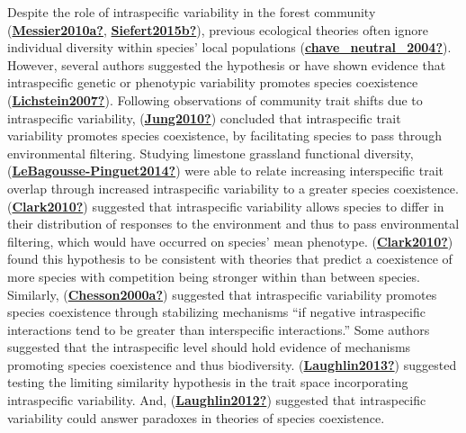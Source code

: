 \documentclass[12pt,twoside,a4paper, a]{article}
\begin{document}
Despite the role of intraspecific variability in the forest community (\protect\hyperlink{ref-Messier2010a}{\textbf{Messier2010a?}}, \protect\hyperlink{ref-Siefert2015b}{\textbf{Siefert2015b?}}), previous ecological theories often ignore individual diversity within species' local populations (\protect\hyperlink{ref-chave_neutral_2004}{\textbf{chave\_neutral\_2004?}}).
However, several authors suggested the hypothesis or have shown evidence that intraspecific genetic or phenotypic variability promotes species coexistence (\protect\hyperlink{ref-Lichstein2007}{\textbf{Lichstein2007?}}).
Following observations of community trait shifts due to intraspecific variability, (\protect\hyperlink{ref-Jung2010}{\textbf{Jung2010?}}) concluded that intraspecific trait variability promotes species coexistence, by facilitating species to pass through environmental filtering.
Studying limestone grassland functional diversity, (\protect\hyperlink{ref-LeBagousse-Pinguet2014}{\textbf{LeBagousse-Pinguet2014?}}) were able to relate increasing interspecific trait overlap through increased intraspecific variability to a greater species coexistence.
(\protect\hyperlink{ref-Clark2010}{\textbf{Clark2010?}}) suggested that intraspecific variability allows species to differ in their distribution of responses to the environment and thus to pass environmental filtering, which would have occurred on species' mean phenotype.
(\protect\hyperlink{ref-Clark2010}{\textbf{Clark2010?}}) found this hypothesis to be consistent with theories that predict a coexistence of more species with competition being stronger within than between species.
Similarly, (\protect\hyperlink{ref-Chesson2000a}{\textbf{Chesson2000a?}}) suggested that intraspecific variability promotes species coexistence through stabilizing mechanisms ``if negative intraspecific interactions tend to be greater than interspecific interactions.''
Some authors suggested that the intraspecific level should hold evidence of mechanisms promoting species coexistence and thus biodiversity.
(\protect\hyperlink{ref-Laughlin2013}{\textbf{Laughlin2013?}}) suggested testing the limiting similarity hypothesis in the trait space incorporating intraspecific variability.
And, (\protect\hyperlink{ref-Laughlin2012}{\textbf{Laughlin2012?}}) suggested that intraspecific variability could answer paradoxes in theories of species coexistence.
\end{document}

